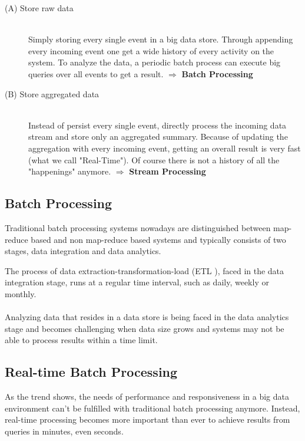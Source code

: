 \begin{description}
    \item[(A) Store raw data]  \hfill \\
    {Simply storing every single event in a big data store. Through appending
    every incoming event one get a wide history of every activity on the system.
    To analyze the data, a periodic batch process can execute big queries over
    all events to get a result.  $ \Rightarrow $  \textbf{Batch Processing}}
    \item[(B) Store aggregated data  ] \hfill \\
    {Instead of persist every single event, directly process the incoming data stream and store
    only an aggregated summary. Because of updating the aggregation with every
    incoming event, getting an overall result is very fast (what we call
    "Real-Time"). Of course there is not a history of all the "happenings"
    anymore. $ \Rightarrow $ \textbf{Stream Processing}} 
\end{description}
\cite{TalkKleppmann}

\subsection{Batch Processing}
\label{intro-datastream-batchprocessing}
Traditional batch processing systems nowadays are distinguished between
map-reduce based and non map-reduce based systems and typically consists of two
stages, data integration and data analytics.  

The process of data extraction-transformation-load (ETL  ), 
faced in the data integration
stage, runs at a regular time interval, such as daily, weekly or monthly. 
\\ \\
Analyzing data that resides in a data store is being faced in the
data analytics stage and becomes challenging when data size grows and systems
may not be able to process results within a time limit.
\cite{Liu:2014:SRP:2628194.2628251}

\subsection{Real-time Batch Processing}

As the trend shows, the needs of performance and responsiveness in a big data environment can't be fulfilled with 
traditional batch processing anymore. Instead, real-time processing becomes more 
important than ever to achieve results from queries in minutes, even seconds. 
\cite{bange2013big}


